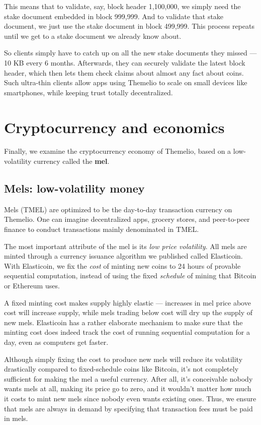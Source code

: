 \documentclass[headinclude]{scrbook}
\begin{document}
This means that to validate, say, block header 1,100,000, we simply need the stake document embedded in block 999,999. And to validate that stake document, we just use the stake document in block 499,999. This process repeats until we get to a stake document we already know about.

So clients simply have to catch up on all the new stake documents they missed --- 10 KB every 6 months. Afterwards, they can securely validate the latest block header, which then lets them check claims about almost any fact about coins. Such ultra-thin clients allow apps using Themelio to scale on small devices like smartphones, while keeping trust totally decentralized.

\section{Cryptocurrency and economics}

Finally, we examine the cryptocurrency economy of Themelio, based on a low-volatility currency called the \textbf{mel}.

\subsection{Mels: low-volatility money}

Mels (TMEL) are optimized to be the day-to-day transaction currency on Themelio. One can imagine decentralized apps, grocery stores, and peer-to-peer finance to conduct transactions mainly denominated in TMEL.

The most important attribute of the mel is its \textit{low price volatility}. All mels are minted through a currency issuance algorithm we published called Elasticoin. With Elasticoin, we fix the \emph{cost} of minting new coins to 24 hours of provable sequential computation, instead of using the fixed \emph{schedule} of mining that Bitcoin or Ethereum uses.

A fixed minting cost makes supply highly elastic --- increases in mel price above cost will increase supply, while mels trading below cost will dry up the supply of new mels. Elasticoin has a rather elaborate mechanism to make sure that the minting cost does indeed track the cost of running sequential computation for a day, even as computers get faster.

Although simply fixing the cost to produce new mels will reduce its volatility drastically compared to fixed-schedule coins like Bitcoin, it's not completely sufficient for making the mel a useful currency. After all, it's conceivable nobody wants mels at all, making its price go to zero, and it wouldn't matter how much it costs to mint new mels since nobody even wants existing ones. Thus, we ensure that mels are always in demand by specifying that transaction fees must be paid in mels.
\end{document}
